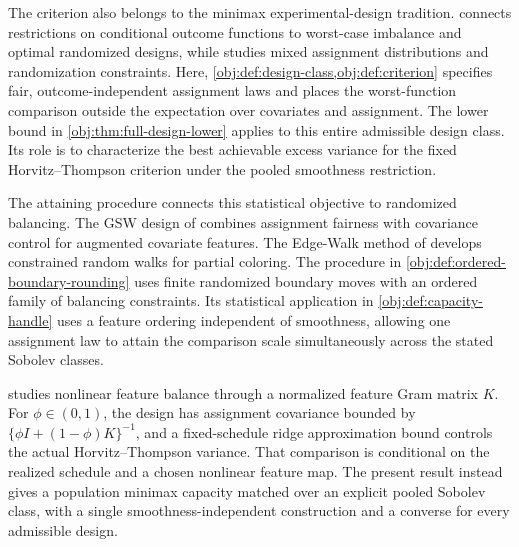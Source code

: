 \documentclass[11pt]{article}
\begin{document}
The criterion also belongs to the minimax experimental-design tradition. \citet[Sections 2.2--2.4]{Kallus2018} connects restrictions on conditional outcome functions to worst-case imbalance and optimal randomized designs, while \citet[Sections 3--5]{Kallus2020} studies mixed assignment distributions and randomization constraints. Here, \cref{obj:def:design-class,obj:def:criterion} specifies fair, outcome-independent assignment laws and places the worst-function comparison outside the expectation over covariates and assignment. The lower bound in \cref{obj:thm:full-design-lower} applies to this entire admissible design class. Its role is to characterize the best achievable excess variance for the fixed Horvitz--Thompson criterion under the pooled smoothness restriction.

The attaining procedure connects this statistical objective to randomized balancing. The GSW design of \citet[Lemma 6.1 and Theorem 6.3]{HarshawSavjeSpielmanZhang2024GSW} combines assignment fairness with covariance control for augmented covariate features. The Edge-Walk method of \citet[Section 2.1]{LovettMeka2015EdgeWalk} develops constrained random walks for partial coloring. The procedure in \cref{obj:def:ordered-boundary-rounding} uses finite randomized boundary moves with an ordered family of balancing constraints. Its statistical application in \cref{obj:def:capacity-handle} uses a feature ordering independent of smoothness, allowing one assignment law to attain the comparison scale simultaneously across the stated Sobolev classes.

\citet[Lemma 4.2 and Proposition 5.1]{Chen2026} studies nonlinear feature balance through a normalized feature Gram matrix \(K\). For \(\phi\in(0,1)\), the design has assignment covariance bounded by \(\{\phi I+(1-\phi)K\}^{-1}\), and a fixed-schedule ridge approximation bound controls the actual Horvitz--Thompson variance. That comparison is conditional on the realized schedule and a chosen nonlinear feature map. The present result instead gives a population minimax capacity matched over an explicit pooled Sobolev class, with a single smoothness-independent construction and a converse for every admissible design.
\end{document}
